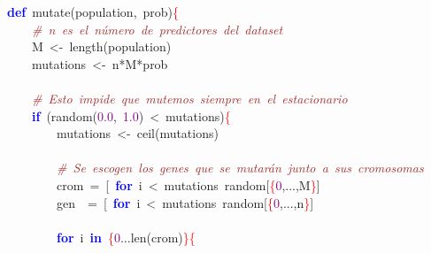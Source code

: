 \noindent
\mbox{}\textbf{\textcolor{Blue}{def}}\ mutate\textcolor{BrickRed}{(}population\textcolor{BrickRed}{,}\ prob\textcolor{BrickRed}{)}\textcolor{Red}{\{} \\
\mbox{}\ \ \ \ \textit{\textcolor{Brown}{\#\ n\ es\ el\ número\ de\ predictores\ del\ dataset}} \\
\mbox{}\ \ \ \ M\ \textcolor{BrickRed}{\textless{}-}\ length\textcolor{BrickRed}{(}population\textcolor{BrickRed}{)} \\
\mbox{}\ \ \ \ mutations\ \textcolor{BrickRed}{\textless{}-}\ n\textcolor{BrickRed}{*}M\textcolor{BrickRed}{*}prob \\
\mbox{} \\
\mbox{}\ \ \ \ \textit{\textcolor{Brown}{\#\ Esto\ impide\ que\ mutemos\ siempre\ en\ el\ estacionario}} \\
\mbox{}\ \ \ \ \textbf{\textcolor{Blue}{if}}\ \textcolor{BrickRed}{(}random\textcolor{BrickRed}{(}\textcolor{Purple}{0.0}\textcolor{BrickRed}{,}\ \textcolor{Purple}{1.0}\textcolor{BrickRed}{)}\ \textcolor{BrickRed}{\textless{}}\ mutations\textcolor{BrickRed}{)}\textcolor{Red}{\{} \\
\mbox{}\ \ \ \ \ \ \ \ mutations\ \textcolor{BrickRed}{\textless{}-}\ ceil\textcolor{BrickRed}{(}mutations\textcolor{BrickRed}{)} \\
\mbox{} \\
\mbox{}\ \ \ \ \ \ \ \ \textit{\textcolor{Brown}{\#\ Se\ escogen\ los\ genes\ que\ se\ mutarán\ junto\ a\ sus\ cromosomas}} \\
\mbox{}\ \ \ \ \ \ \ \ crom\ \textcolor{BrickRed}{=}\ \textcolor{BrickRed}{[}\ \textbf{\textcolor{Blue}{for}}\ i\ \textcolor{BrickRed}{\textless{}}\ mutations\ random\textcolor{BrickRed}{[}\textcolor{Red}{\{}\textcolor{Purple}{0}\textcolor{BrickRed}{,...,}M\textcolor{Red}{\}}\textcolor{BrickRed}{]} \\
\mbox{}\ \ \ \ \ \ \ \ gen\ \ \textcolor{BrickRed}{=}\ \textcolor{BrickRed}{[}\ \textbf{\textcolor{Blue}{for}}\ i\ \textcolor{BrickRed}{\textless{}}\ mutations\ random\textcolor{BrickRed}{[}\textcolor{Red}{\{}\textcolor{Purple}{0}\textcolor{BrickRed}{,...,}n\textcolor{Red}{\}}\textcolor{BrickRed}{]} \\
\mbox{} \\
\mbox{}\ \ \ \ \ \ \ \ \textbf{\textcolor{Blue}{for}}\ i\ \textbf{\textcolor{Blue}{in}}\ \textcolor{Red}{\{}\textcolor{Purple}{0}\textcolor{BrickRed}{...}len\textcolor{BrickRed}{(}crom\textcolor{BrickRed}{)}\textcolor{Red}{\}\{} \\
